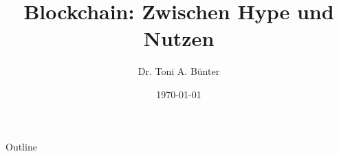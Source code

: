 \documentclass{beamer}
\title{Blockchain: Zwischen Hype und Nutzen}
\author{Dr. Toni A. Bünter}
\date{\today}
\begin{document}
    \begin{frame}
        \titlepage
    \end{frame}

    \logo{}


    \begin{frame}{Outline}
        \tableofcontents
    \end{frame}




    
    
\end{document}
